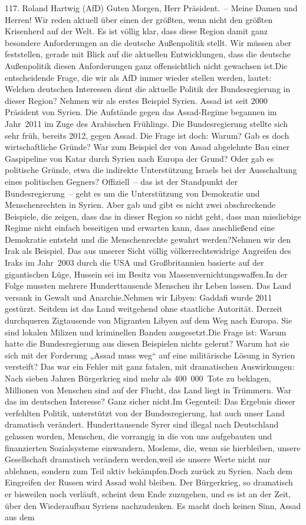 \documentclass{article}
\begin{document}
	117. Roland Hartwig (AfD) Guten Morgen, Herr Präsident. – Meine Damen und Herren! Wir reden aktuell über einen der größten, wenn nicht den größten Krisenherd auf der Welt. Es ist völlig klar, dass diese Region damit ganz besondere Anforderungen an die deutsche Außenpolitik stellt. Wir müssen aber feststellen, gerade mit Blick auf die aktuellen Entwicklungen, dass die deutsche Außenpolitik diesen Anforderungen ganz offensichtlich nicht gewachsen ist.Die entscheidende Frage, die wir als AfD immer wieder stellen werden, lautet: Welchen deutschen Interessen dient die aktuelle Politik der Bundesregierung in dieser Region? Nehmen wir als erstes Beispiel Syrien. Assad ist seit 2000 Präsident von Syrien. Die Aufstände gegen das Assad-Regime begannen im Jahr 2011 im Zuge des Arabischen Frühlings. Die Bundesregierung stellte sich sehr früh, bereits 2012, gegen Assad. Die Frage ist doch: Warum? Gab es doch wirtschaftliche Gründe? War zum Beispiel der von Assad abgelehnte Bau einer Gaspipeline von Katar durch Syrien nach Europa der Grund? Oder gab es politische Gründe, etwa die indirekte Unterstützung Israels bei der Ausschaltung eines politischen Gegners? Offiziell – das ist der Standpunkt der Bundesregierung – geht es um die Unterstützung von Demokratie und Menschenrechten in Syrien. Aber gab und gibt es nicht zwei abschreckende Beispiele, die zeigen, dass das in dieser Region so nicht geht, dass man missliebige Regime nicht einfach beseitigen und erwarten kann, dass anschließend eine Demokratie entsteht und die Menschenrechte gewahrt werden?Nehmen wir den Irak als Beispiel. Das aus unserer Sicht völlig völkerrechtswidrige Angreifen des Iraks im Jahr 2003 durch die USA und Großbritannien basierte auf der gigantischen Lüge, Hussein sei im Besitz von Massenvernichtungswaffen.In der Folge mussten mehrere Hunderttausende Menschen ihr Leben lassen. Das Land versank in Gewalt und Anarchie.Nehmen wir Libyen: Gaddafi wurde 2011 gestürzt. Seitdem ist das Land weitgehend ohne staatliche Autorität. Derzeit durchqueren Zigtausende von Migranten Libyen auf dem Weg nach Europa. Sie sind lokalen Milizen und kriminellen Banden ausgesetzt.Die Frage ist: Warum hatte die Bundesregierung aus diesen Beispielen nichts gelernt? Warum hat sie sich mit der Forderung „Assad muss weg“ auf eine militärische Lösung in Syrien versteift? Das war ein Fehler mit ganz fatalen, mit dramatischen Auswirkungen: Nach sieben Jahren Bürgerkrieg sind mehr als 400 000 Tote zu beklagen, Millionen von Menschen sind auf der Flucht, das Land liegt in Trümmern. War das im deutschen Interesse? Ganz sicher nicht.Im Gegenteil: Das Ergebnis dieser verfehlten Politik, unterstützt von der Bundesregierung, hat auch unser Land dramatisch verändert. Hunderttausende Syrer sind illegal nach Deutschland gelassen worden, Menschen, die vorrangig in die von uns aufgebauten und finanzierten Sozialsysteme einwandern, Moslems, die, wenn sie hierbleiben, unsere Gesellschaft dramatisch verändern werden,weil sie unsere Werte nicht nur ablehnen, sondern zum Teil aktiv bekämpfen.Doch zurück zu Syrien. Nach dem Eingreifen der Russen wird Assad wohl bleiben. Der Bürgerkrieg, so dramatisch er bisweilen noch verläuft, scheint dem Ende zuzugehen, und es ist an der Zeit, über den Wiederaufbau Syriens nachzudenken. Es macht doch keinen Sinn, Assad aus dem 
\end{document}
